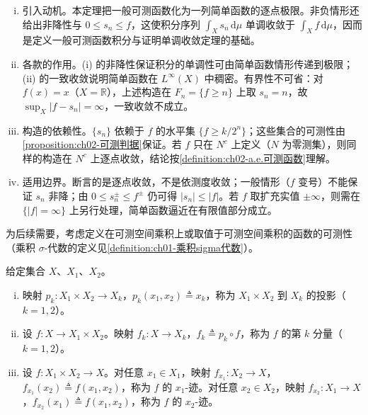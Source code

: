 \documentclass[../../main.tex]{subfiles}%
\begin{document}
\begin{remark}\label{remark:ch02-简单逼近}
\begin{enumerate}[(i)]
\item 引入动机。本定理把一般可测函数化为一列简单函数的逐点极限。非负情形还给出非降性与 $0\leqslant s_n\leqslant f$，这使积分序列 $\int_X s_n\,\mathrm{d}\mu$ 单调收敛于 $\int_X f\,\mathrm{d}\mu$，因而是定义一般可测函数积分与证明单调收敛定理的基础。
\item 各款的作用。(i) 的非降性保证积分的单调性可由简单函数情形传递到极限；(ii) 的一致收敛说明简单函数在 $L^\infty(X)$ 中稠密。有界性不可省：对 $f(x)=x$（$X=\mathbb{R}$），上述构造在 $F_n=\{f\geqslant n\}$ 上取 $s_n=n$，故 $\sup_X|f-s_n|=\infty$，一致收敛不成立。
\item 构造的依赖性。$\{s_n\}$ 依赖于 $f$ 的水平集 $\{f\geqslant k/2^n\}$；这些集合的可测性由\cref{proposition:ch02-可测判据}保证。若 $f$ 只在 $N^c$ 上定义（$N$ 为零测集），则同样的构造在 $N^c$ 上逐点收敛，结论按\cref{definition:ch02-a.e.可测函数}理解。
\item 适用边界。断言的是逐点收敛，不是依测度收敛；一般情形（$f$ 变号）不能保证 $s_n$ 非降；由 $0\leqslant s_n^\pm\leqslant f^\pm$ 仍可得 $|s_n|\leqslant|f|$。若 $f$ 取扩充实值 $\pm\infty$，则需在 $\{|f|=\infty\}$ 上另行处理，简单函数逼近在有限值部分成立。
\end{enumerate}
\end{remark}

为后续需要，考虑定义在可测空间乘积上或取值于可测空间乘积的函数的可测性（乘积 $\sigma$-代数的定义见\cref{definition:ch01-乘积sigma代数}）。

\begin{definition}\label{definition:ch02-投影分量迹}
给定集合 $X$、$X_1$、$X_2$。
\begin{enumerate}[(i)]
\item 映射 $p_k:X_1\times X_2\to X_k$，$p_k(x_1,x_2)\triangleq x_k$，称为 $X_1\times X_2$ 到 $X_k$ 的投影（$k=1,2$）。
\item 设 $f:X\to X_1\times X_2$。映射 $f_k:X\to X_k$，$f_k\triangleq p_k\circ f$，称为 $f$ 的第 $k$ 分量（$k=1,2$）。
\item 设 $f:X_1\times X_2\to X$。对任意 $x_1\in X_1$，映射 $f_{x_1}:X_2\to X$，$f_{x_1}(x_2)\triangleq f(x_1,x_2)$，称为 $f$ 的 $x_1$-迹。对任意 $x_2\in X_2$，映射 $f_{x_2}:X_1\to X$，$f_{x_2}(x_1)\triangleq f(x_1,x_2)$，称为 $f$ 的 $x_2$-迹。
\end{enumerate}
\end{definition}
\end{document}
